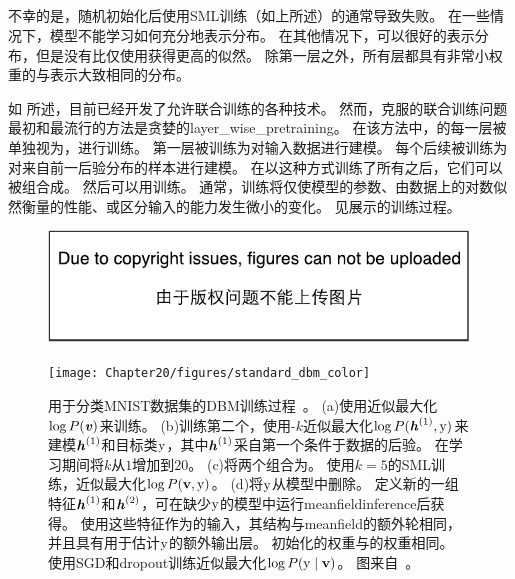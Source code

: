\subsection{}
\label{sec:layer_wise_pretraining}

不幸的是，随机初始化后使用\gls{SML}训练（如上所述）的通常导致失败。
在一些情况下，模型不能学习如何充分地表示分布。
在其他情况下，可以很好的表示分布，但是没有比仅使用获得更高的似然。
除第一层之外，所有层都具有非常小权重的与表示大致相同的分布。

如 所述，目前已经开发了允许联合训练的各种技术。
然而，克服的联合训练问题最初和最流行的方法是贪婪的\gls{layer_wise_pretraining}。
在该方法中，的每一层被单独视为，进行训练。
第一层被训练为对输入数据进行建模。
每个后续被训练为对来自前一后验分布的样本进行建模。
在以这种方式训练了所有之后，它们可以被组合成。
然后可以用训练。
通常，训练将仅使模型的参数、由数据上的对数似然衡量的性能、或区分输入的能力发生微小的变化。
见展示的训练过程。

\begin{figure}[!htb]
\ifOpenSource
\centerline{\includegraphics{figure.pdf}}
\else
\centerline{\texttt{[image: Chapter20/figures/standard\_dbm\_color]}}
\fi
\caption{用于分类MNIST数据集的\gls{DBM}训练过程~\citep{SalHinton09,Srivastava14}。
(a)使用近似最大化$\log P(\boldsymbol{\mathit{v}})$来训练。
(b)训练第二个，使用-$k$近似最大化$\log P(\boldsymbol{\mathit{h}}^{(1)}, \mathrm{y})$来建模$\boldsymbol{\mathit{h}}^{(1)}$和目标类$\mathrm{y}$，其中$\boldsymbol{\mathit{h}}^{(1)}$采自第一个条件于数据的后验。 在学习期间将$k$从$1$增加到$20$。
(c)将两个组合为。
使用$k = 5$的\gls{SML}训练，近似最大化$\log P(\mathbf{v}, \mathrm{y})$。
(d)将$\mathrm{y}$从模型中删除。
定义新的一组特征$\boldsymbol{\mathit{h}}^{(1)}$和$\boldsymbol{\mathit{h}}^{(2)}$，可在缺少$\mathrm{y}$的模型中运行\gls{meanfield}\gls{inference}后获得。%
使用这些特征作为的输入，其结构与\gls{meanfield}的额外轮相同，并且具有用于估计$\mathrm{y}$的额外输出层。
初始化的权重与的权重相同。
使用\gls{SGD}和\gls{dropout}训练近似最大化$\log P(\mathrm{y} \mid \mathbf{v})$。
图来自~\citet{Goodfellow-et-al-NIPS2013}。
}
\label{fig:chap20_standard_dbm_color}
\end{figure}

